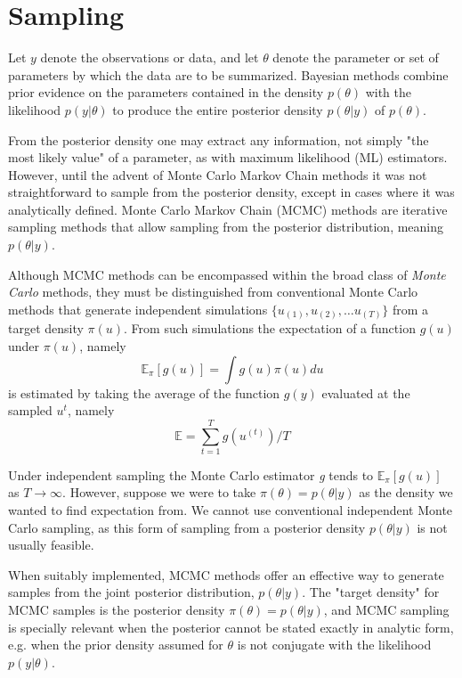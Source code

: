 \documentclass{article}
\begin{document}
\section{Sampling}

Let $y$ denote the observations or data, and let $\theta$ denote the parameter or set of parameters by which the data are to be summarized. Bayesian methods combine prior evidence on the parameters contained in the density $p(\theta)$ with the likelihood $p(y|\theta)$ to produce the entire posterior density $p(\theta|y)$ of $p(\theta)$.

From the posterior density one may extract any information, not simply "the most likely value" of a parameter, as with maximum likelihood (ML) estimators. However, until the advent of Monte Carlo Markov Chain methods it was not straightforward to sample from the posterior density, except in cases where it was analytically defined. Monte Carlo Markov Chain (MCMC) methods are iterative sampling methods that allow sampling from the posterior distribution, meaning $p(\theta|y)$.

Although MCMC methods can be encompassed within the broad class of \textit{Monte Carlo} methods, they must be distinguished from conventional Monte Carlo methods that generate independent simulations $\{ u_(1), u_(2), \ldots u_(T) \}$ from a target density $\pi(u)$. From such simulations the expectation of a function $g(u)$ under $\pi(u)$, namely 
    $$ \mathbb{E}_{\pi}[g(u)] = \int{g(u)\pi(u)du}$$ 
    is estimated by taking the average of the function $g(y)$ evaluated at the sampled $u^{t}$, namely 
    $$ \mathbb{E} = \sum_{t=1}^{T} g(u^{(t)})/T $$

Under independent sampling the Monte Carlo estimator \textit{g} tends to $\mathbb{E}_{\pi}[g(u)]$ as $T \rightarrow \infty$.
However, suppose we were to take $\pi(\theta) = p(\theta|y)$ as the density we wanted to find expectation from. We cannot use conventional independent Monte Carlo sampling, as this form of sampling from a posterior density $p(\theta|y)$ is not usually feasible.

When suitably implemented, MCMC methods offer an effective way to generate samples from the joint posterior distribution, $p(\theta|y)$. The "target density" for MCMC samples is the posterior density $\pi(\theta) = p(\theta|y)$, and MCMC sampling is specially relevant when the posterior cannot be stated exactly in analytic form, e.g. when the prior density assumed for $\theta$ is not conjugate with the likelihood $p(y|\theta)$.
\end{document}
